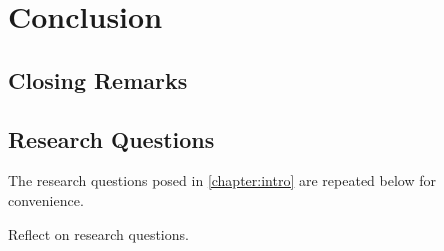\chapter{Conclusion}
\label{chapter:conc}

\section{Closing Remarks}
\label{section:conc-closing-remarks}

\section{Research Questions}
\label{section:conc-research-questions}

The research questions posed in \cref{chapter:intro} are repeated below for convenience.


Reflect on research questions.